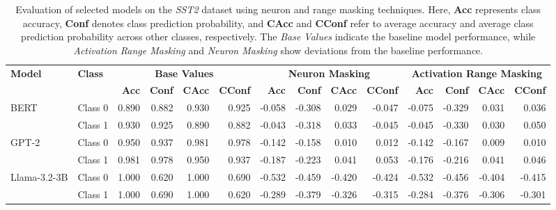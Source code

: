 \begin{table*}[t]
\caption{Evaluation of selected models on the \textit{SST2} dataset using neuron and range masking techniques. Here, \textbf{Acc} represents class accuracy, \textbf{Conf} denotes class prediction probability, and \textbf{CAcc} and \textbf{CConf} refer to average accuracy and average class prediction probability across other classes, respectively. The \textit{Base Values} indicate the baseline model performance, while \textit{Activation Range Masking} and \textit{Neuron Masking} show deviations from the baseline performance.}
\centering
\scriptsize
\begin{tabular}{l|l|rrrr|rrrr|rrrr}
\toprule
\textbf{Model} & \textbf{Class} & \multicolumn{4}{c|}{\textbf{Base Values}} & \multicolumn{4}{c|}{\textbf{Neuron Masking}} & \multicolumn{4}{c}{\textbf{Activation Range Masking}} \\
\cmidrule(r){2-5} \cmidrule(r){6-9} \cmidrule{10-14}
&  & \textbf{Acc} & \textbf{Conf} & \textbf{CAcc} & \textbf{CConf} & \textbf{Acc} & \textbf{Conf} & \textbf{CAcc} & \textbf{CConf} & \textbf{Acc} & \textbf{Conf} & \textbf{CAcc} & \textbf{CConf} \\
\midrule
\multirow{2}{*}{BERT} 
&Class 0 & 0.890 & 0.882 & 0.930 & 0.925 & -0.058 & -0.308 & 0.029 & -0.047 & -0.075 & -0.329 & 0.031 & 0.036 \\
&Class 1 & 0.930 & 0.925 & 0.890 & 0.882 & -0.043 & -0.318 & 0.033 & -0.045 & -0.045 & -0.330 & 0.030 & 0.050 \\
\midrule
\multirow{2}{*}{GPT-2} 
&Class 0 & 0.950 & 0.937 & 0.981 & 0.978 & -0.142 & -0.158 & 0.010 & 0.012 & -0.142 & -0.167 & 0.009 & 0.010 \\
&Class 1 & 0.981 & 0.978 & 0.950 & 0.937 & -0.187 & -0.223 & 0.041 & 0.053 & -0.176 & -0.216 & 0.041 & 0.046 \\
\midrule
\multirow{2}{*}{Llama-3.2-3B} 
&Class 0 & 1.000 & 0.620 & 1.000 & 0.690 & -0.532 & -0.459 & -0.420 & -0.424 & -0.532 & -0.456 & -0.404 & -0.415 \\
&Class 1 & 1.000 & 0.690 & 1.000 & 0.620 & -0.289 & -0.379 & -0.326 & -0.315 & -0.284 & -0.376 & -0.306 & -0.301 \\

\bottomrule
\end{tabular}

\label{tab:sst_on_all}
\end{table*}

